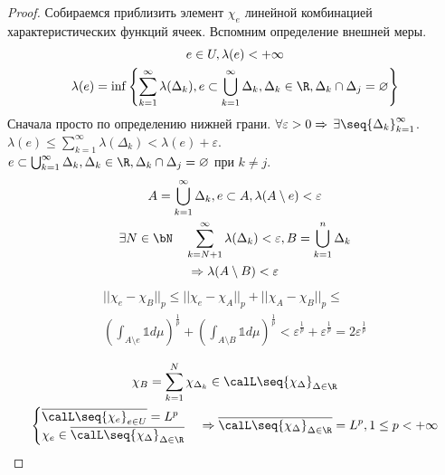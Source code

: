 \documentclass[document]{subfiles}
\begin{document}
\begin{proof}
    Собираемся приблизить элемент $\chi_e$ линейной комбинацией характеристических функций ячеек. Вспомним определение внешней меры.
    \begin{gather*}
        e \in U, \lambda(e) < + \infty \\
        \lambda(e) = \inf \left\{ \sum^\infty_{k=1} \lambda(\Delta_k), e \subset \bigcup^\infty_{k=1} \Delta_k, \Delta_k \in \R, \Delta_k \cap \Delta_j = \varnothing \right\}
    \end{gather*}
    Сначала просто по определению нижней грани. $\forall \varepsilon > 0 \Rightarrow \, \exists \seq{\Delta_k}^\infty_{k=1}$.
    $\lambda(e) \leq \sum^\infty_{k=1} \lambda(\Delta_k) < \lambda(e) + \varepsilon$. \\
    $e \subset \bigcup^\infty_{k=1} \Delta_k, \Delta_k \in \R, \Delta_k \cap \Delta_j = \varnothing$ при $k \ne j$. \\
    \begin{gather*}
        A = \bigcup^\infty_{k=1} \Delta_k, e \subset A, \lambda(A \setminus e) < \varepsilon \\
        \exists N \in \bN \quad \sum^\infty_{k=N+1} \lambda(\Delta_k) < \varepsilon, B = \bigcup^n_{k=1} \Delta_k \\
        \Rightarrow \lambda(A \setminus B) < \varepsilon 
    \end{gather*}
    \begin{multline*}
        || \chi_e - \chi_B ||_p \leq ||\chi_e - \chi_A||_p + ||\chi_A - \chi_B||_p \leq \\
        \left( \int_{A \setminus e} \mathbb{1} d\mu \right)^{\frac{1}{p}} + \left( \int_{A \setminus B} \mathbb{1} d\mu \right)^{\frac{1}{p}} < \varepsilon^{\frac{1}{p}} + \varepsilon^{\frac{1}{p}} = 2 \varepsilon^{\frac{1}{p}} 
    \end{multline*}

    \begin{gather*}
        \chi_B = \sum^N_{k=1} \chi_{\Delta_k} \in \calL \seq{\chi_\Delta}_{\Delta \in \R} \\
        \begin{cases}
            \overline{\calL \seq{\chi_e}_{e \in U}} = L^p \\
            \chi_e \in \overline{\calL \seq{\chi_\Delta}_{\Delta \in \R}}
        \end{cases} \Rightarrow \overline{\calL \seq{\chi_\Delta}_{\Delta \in \R}} = L^p, 1 \leq p < + \infty
    \end{gather*}

\end{proof}
\end{document}
